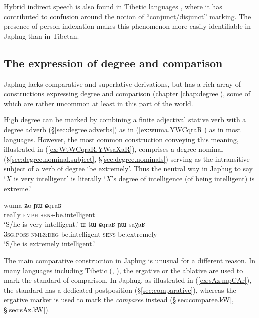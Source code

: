 Hybrid indirect speech is also found in  Tibetic languages \citep{tournadre08conjunct}, where it has contributed to confusion around the notion of ``conjunct/disjunct'' marking. The presence of person indexation makes this phenomenon more easily identifiable in Japhug than in Tibetan.
 
\subsection{The expression of degree and comparison}
Japhug lacks comparative and superlative derivations, but has a rich array of constructions  expressing degree and comparison (chapter \ref{chap:degree}), some of which are rather uncommon at least in this part of the world.

High degree can be marked by combining a finite adjectival stative verb with a degree adverb (§\ref{sec:degree.adverbs}) as in (\ref{ex:wuma.YWCqraR}) as in most languages. However, the most common construction conveying this meaning, illustrated in (\ref{ex:WtWCqraR.YWsaXaR}), comprises a degree nominal (§\ref{sec:degree.nominal.subject}, §\ref{sec:degree.nominals}) serving as the intransitive subject of a verb of degree `be extremely'. Thus the neutral way in Japhug to say `$X$ is very intelligent' is literally `$X$'s degree of intelligence (of being intelligent) is extreme.'

\begin{exe} 
\ex 
\begin{xlist}
\ex \label{ex:wuma.YWCqraR}
\gll wuma ʑo ɲɯ-ɕqraʁ \\
really \textsc{emph} \textsc{sens}-be.intelligent \\
\glt `S/he is very intelligent.' 
\ex \label{ex:WtWCqraR.YWsaXaR}
\gll ɯ-tɯ-ɕqraʁ ɲɯ-saχaʁ \\
\textsc{3sg}.\textsc{poss}-\textsc{nmlz}:\textsc{deg}-be.intelligent \textsc{sens}-be.extremely \\
\glt `S/he is extremely intelligent.' 
\end{xlist}
\end{exe} 

The main comparative construction in Japhug is unusual for a different reason. In many languages including Tibetic (\citealt[239]{vbrugmo03maqu}, \citealt[29]{heine-kuteva02}), the ergative or the  ablative are used to mark the standard of comparison. In Japhug, as illustrated in (\ref{ex:sAz.mpCAr}), the standard has a dedicated postposition (§\ref{sec:comparative}), whereas the ergative marker  is used to mark the \textit{comparee} instead (§\ref{sec:comparee.kW}, §\ref{sec:sAz.kW}). 


